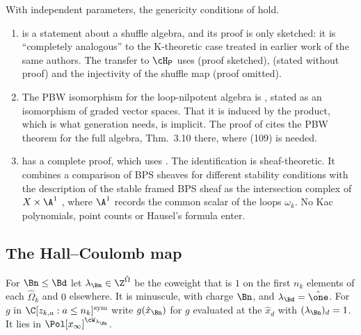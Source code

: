 \begin{remark}\label{rem:bps-status}
With independent parameters, the genericity conditions of
\cite[\S2.2]{jindalLoopNilpotent2026} hold.
\begin{enumerate}[leftmargin=2em]
\item \cite[Thm.~2.4]{jindalLoopNilpotent2026} is a statement about a
shuffle algebra, and its proof is only sketched: it is ``completely
analogous'' to the K-theoretic case treated in earlier work of the same
authors.  The transfer to $\cH_{\mathsf P}$ uses
\cite[Prop.~3.7]{jindalLoopNilpotent2026} (proof sketched),
\cite[Lemma~3.6]{jindalLoopNilpotent2026} (stated without proof) and the
injectivity of the shuffle map \cite[Thm.~3.5]{jindalLoopNilpotent2026} (proof
omitted).
\item The PBW isomorphism for the loop-nilpotent algebra is
\cite[(109)]{jindalLoopNilpotent2026}, stated as an isomorphism of graded
vector spaces.  That it is induced by the product, which is what generation
needs, is implicit.  The proof of \cite[Cor.~3.15]{jindalLoopNilpotent2026}
cites the PBW theorem for the full algebra, Thm.~3.10 there, where (109) is
needed.
\item \cite[Prop.~3.14]{jindalLoopNilpotent2026} has a complete proof, which
uses \cite[Thm.~3.5]{jindalLoopNilpotent2026}.  The identification
\cite[Cor.~3.13]{bottaOkounkovConjecture2023} is sheaf-theoretic.  It combines
a comparison of BPS sheaves for different stability conditions
\cite[Prop.~3.4]{bottaOkounkovConjecture2023} with the description of the
stable framed BPS sheaf as the intersection complex of $X\times\A^1$
\cite[Prop.~3.11]{bottaOkounkovConjecture2023}, where $\A^1$ records the
common scalar of the loops $\omega_k$.  No Kac polynomials, point counts or
Hausel's formula enter.
\end{enumerate}
\end{remark}

\subsection{The Hall--Coulomb map}\label{ss:bps-map}
For $\Bn\le\Bd$ let $\lambda_\Bn\in\Z^{\hat\Omega}$ be the coweight that is $1$ on
the first $n_k$ elements of each $\hat\Omega_k$ and $0$ elsewhere.  It is
minuscule, with charge $\Bn$, and $\lambda_\Bd=\hat\one$.  For $g$ in
$\C[z_{k,a}:a\le n_k]^{\mathrm{sym}}$ write $g(\hat x_\Bn)$ for $g$
evaluated at the $\hat x_d$ with $(\lambda_\Bn)_d=1$.  It lies in
$\Pol[x_\infty]^{\cW_{\lambda_\Bn}}$.

